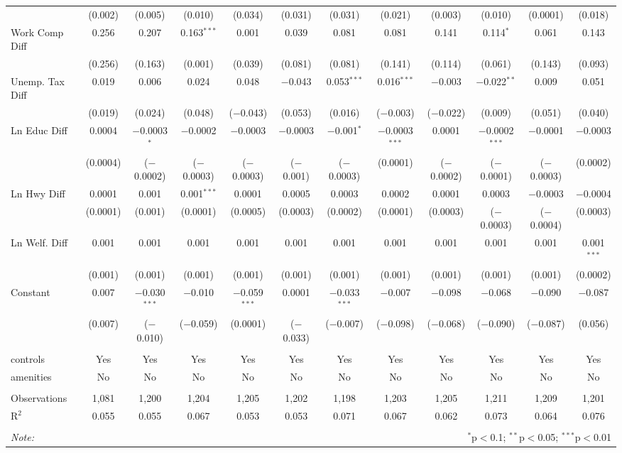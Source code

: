 \begin{table}[!htbp]
\begin{tabular}{@{\extracolsep{5pt}}lccccccccccc}
  & (0.002) & (0.005) & (0.010) & (0.034) & (0.031) & (0.031) & (0.021) & (0.003) & (0.010) & (0.0001) & (0.018) \\ 
  Work Comp Diff & 0.256 & 0.207 & 0.163$^{***}$ & 0.001 & 0.039 & 0.081 & 0.081 & 0.141 & 0.114$^{*}$ & 0.061 & 0.143 \\ 
  & (0.256) & (0.163) & (0.001) & (0.039) & (0.081) & (0.081) & (0.141) & (0.114) & (0.061) & (0.143) & (0.093) \\ 
  Unemp. Tax Diff & 0.019 & 0.006 & 0.024 & 0.048 & $-$0.043 & 0.053$^{***}$ & 0.016$^{***}$ & $-$0.003 & $-$0.022$^{**}$ & 0.009 & 0.051 \\ 
  & (0.019) & (0.024) & (0.048) & ($-$0.043) & (0.053) & (0.016) & ($-$0.003) & ($-$0.022) & (0.009) & (0.051) & (0.040) \\ 
  Ln Educ Diff & 0.0004 & $-$0.0003$^{*}$ & $-$0.0002 & $-$0.0003 & $-$0.0003 & $-$0.001$^{*}$ & $-$0.0003$^{***}$ & 0.0001 & $-$0.0002$^{***}$ & $-$0.0001 & $-$0.0003 \\ 
  & (0.0004) & ($-$0.0002) & ($-$0.0003) & ($-$0.0003) & ($-$0.001) & ($-$0.0003) & (0.0001) & ($-$0.0002) & ($-$0.0001) & ($-$0.0003) & (0.0002) \\ 
  Ln Hwy Diff & 0.0001 & 0.001 & 0.001$^{***}$ & 0.0001 & 0.0005 & 0.0003 & 0.0002 & 0.0001 & 0.0003 & $-$0.0003 & $-$0.0004 \\ 
  & (0.0001) & (0.001) & (0.0001) & (0.0005) & (0.0003) & (0.0002) & (0.0001) & (0.0003) & ($-$0.0003) & ($-$0.0004) & (0.0003) \\ 
  Ln Welf. Diff & 0.001 & 0.001 & 0.001 & 0.001 & 0.001 & 0.001 & 0.001 & 0.001 & 0.001 & 0.001 & 0.001$^{***}$ \\ 
  & (0.001) & (0.001) & (0.001) & (0.001) & (0.001) & (0.001) & (0.001) & (0.001) & (0.001) & (0.001) & (0.0002) \\ 
  Constant & 0.007 & $-$0.030$^{***}$ & $-$0.010 & $-$0.059$^{***}$ & 0.0001 & $-$0.033$^{***}$ & $-$0.007 & $-$0.098 & $-$0.068 & $-$0.090 & $-$0.087 \\ 
  & (0.007) & ($-$0.010) & ($-$0.059) & (0.0001) & ($-$0.033) & ($-$0.007) & ($-$0.098) & ($-$0.068) & ($-$0.090) & ($-$0.087) & (0.056) \\ 
 \hline \\[-1.8ex] 
controls & Yes & Yes & Yes & Yes & Yes & Yes & Yes & Yes & Yes & Yes & Yes \\ 
amenities & No & No & No & No & No & No & No & No & No & No & No \\ 
\hline \\[-1.8ex] 
Observations & 1,081 & 1,200 & 1,204 & 1,205 & 1,202 & 1,198 & 1,203 & 1,205 & 1,211 & 1,209 & 1,201 \\ 
R$^{2}$ & 0.055 & 0.055 & 0.067 & 0.053 & 0.053 & 0.071 & 0.067 & 0.062 & 0.073 & 0.064 & 0.076 \\ 
\hline 
\hline \\[-1.8ex] 
\textit{Note:}  & \multicolumn{11}{r}{$^{*}$p$<$0.1; $^{**}$p$<$0.05; $^{***}$p$<$0.01} \\ 
\end{tabular} 
\end{table} 
